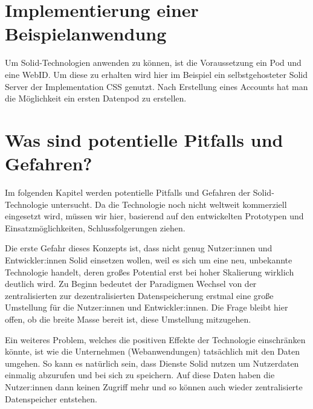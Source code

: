 \documentclass[acmtog]{acmart}
\begin{document}
\label{section:implementierungEinerBeispielanwendung}
\section{Implementierung einer Beispielanwendung}
Um Solid-Technologien anwenden zu können, ist die Voraussetzung ein Pod und eine WebID. Um diese zu erhalten wird hier im Beispiel ein selbstgehosteter Solid Server der Implementation CSS genutzt. Nach Erstellung eines Accounts hat man die Möglichkeit ein ersten Datenpod zu erstellen. 

\label{section:wasSindPotentiellePitfallsUndGefahren}
\section{Was sind potentielle Pitfalls und Gefahren?}

Im folgenden Kapitel werden potentielle Pitfalls und Gefahren der Solid-Technologie untersucht. Da die Technologie noch nicht weltweit kommerziell eingesetzt wird, müssen wir hier, basierend auf den entwickelten Prototypen und Einsatzmöglichkeiten, Schlussfolgerungen ziehen.

Die erste Gefahr dieses Konzepts ist, dass nicht genug Nutzer:innen und Entwickler:innen Solid einsetzen wollen, weil es sich um eine neu, unbekannte Technologie handelt, deren großes Potential erst bei hoher Skalierung wirklich deutlich wird. Zu Beginn bedeutet der Paradigmen Wechsel von der zentralisierten zur dezentralisierten Datenspeicherung erstmal eine große Umstellung für die Nutzer:innen und Entwickler:innen. Die Frage bleibt hier offen, ob die breite Masse bereit ist, diese Umstellung mitzugehen.

Ein weiteres Problem, welches die positiven Effekte der Technologie einschränken könnte, ist wie die Unternehmen (Webanwendungen) tatsächlich mit den Daten umgehen. So kann es natürlich sein, dass Dienste Solid nutzen um Nutzerdaten einmalig abzurufen und bei sich zu speichern. Auf diese Daten haben die Nutzer:innen dann keinen Zugriff mehr und so können auch wieder zentralisierte Datenspeicher entstehen.
\end{document}
